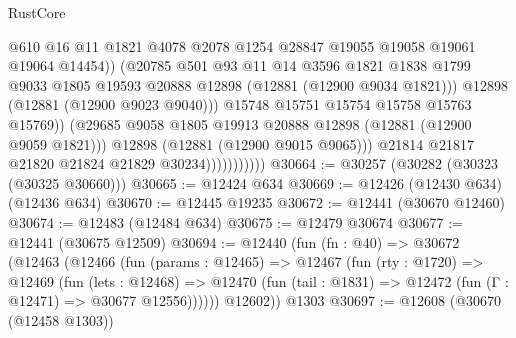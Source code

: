 \begin{lexlean}{RustCore}
\begin{coremodule}
                                      @610
                                      @16
                                      @11
                                      @1821
                                      @4078
                                      @2078
                                      @1254
                                      @28847
                                      @19055
                                      @19058
                                      @19061
                                      @19064
                                      @14454))
                                  (@20785
                                    @501
                                    @93
                                    @11
                                    @14
                                    @3596
                                    @1821
                                    @1838
                                    @1799
                                    @9033
                                    @1805
                                    @19593
                                    @20888
                                    @12898
                                    (@12881 (@12900 @9034 @1821)))
                                  @12898
                                  (@12881 (@12900 @9023 @9040)))
                                @15748
                                @15751
                                @15754
                                @15758
                                @15763
                                @15769))
                            (@29685 @9058 @1805 @19913 @20888 @12898 (@12881 (@12900 @9059 @1821)))
                            @12898
                            (@12881 (@12900 @9015 @9065)))
                          @21814
                          @21817
                          @21820
                          @21824
                          @21829
                          @30234)))))))))))
@30664 := @30257 (@30282 (@30323 (@30325 @30660)))
@30665 := @12424 @634
@30669 := @12426 (@12430 @634) (@12436 @634)
@30670 := @12445 @19235
@30672 := @12441 (@30670 @12460)
@30674 := @12483 (@12484 @634)
@30675 := @12479 @30674
@30677 := @12441 (@30675 @12509)
@30694 := @12440
    (fun (fn : @40) =>
    @30672
      (@12463
        (@12466
          (fun (params : @12465) =>
          @12467
            (fun (rty : @1720) =>
            @12469
              (fun (lets : @12468) =>
              @12470 (fun (tail : @1831) => @12472 (fun (Γ : @12471) => @30677 @12556))))))
        @12602))
    @1303
@30697 := @12608 (@30670 (@12458 @1303))

\end{coremodule}
\end{lexlean}
